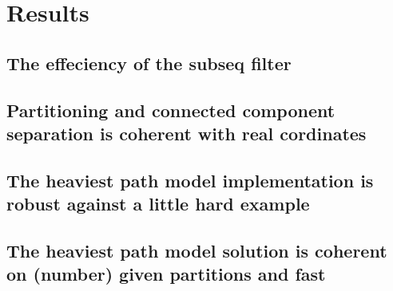 \chapter{Results}

\section{The effeciency of the subseq filter}

\section{Partitioning and connected component separation is coherent with real cordinates}

\section{The heaviest path model implementation is robust against a little hard example}

\section{The heaviest path model solution is coherent on (number) given partitions and fast}

\newpage